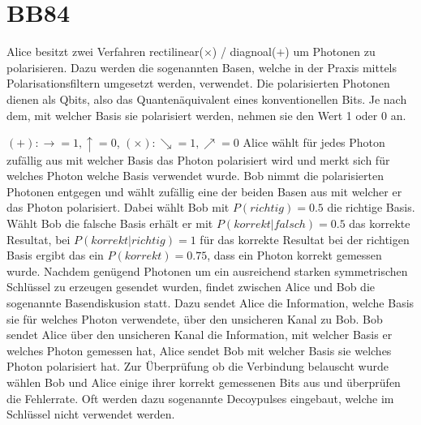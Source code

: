 \section{BB84}

  Alice besitzt zwei Verfahren rectilinear($\times$) / diagnoal($+$) um Photonen zu polarisieren.
  Dazu werden die sogenannten Basen, welche in der Praxis mittels Polarisationsfiltern umgesetzt werden, verwendet.
  Die polarisierten Photonen dienen als Qbits, also das Quanten\"aquivalent eines konventionellen Bits.
  Je nach dem, mit welcher Basis sie polarisiert werden, nehmen sie den Wert 1 oder 0 an.\par
  $(+): \rightarrow = 1, \uparrow = 0 $, $(\times): \searrow = 1, \nearrow = 0$
  Alice w\"ahlt f\"ur jedes Photon zuf\"allig aus mit welcher Basis das Photon polarisiert wird und merkt sich f\"ur welches Photon welche Basis verwendet wurde.
  Bob nimmt die polarisierten Photonen entgegen und w\"ahlt zuf\"allig eine der beiden Basen aus mit welcher er das Photon polarisiert.
  Dabei w\"ahlt Bob mit $P(richtig)=0.5$ die richtige Basis.
  W\"ahlt Bob die falsche Basis erh\"alt er mit $P(korrekt|falsch)=0.5$ das korrekte Resultat, bei $P(korrekt|richtig)=1$ f\"ur das korrekte Resultat bei der richtigen Basis ergibt das ein $P(korrekt)=0.75$, dass ein Photon korrekt gemessen wurde.
  Nachdem gen\"ugend Photonen um ein ausreichend starken symmetrischen Schl\"ussel zu erzeugen gesendet wurden, findet zwischen Alice und Bob die sogenannte Basendiskusion statt.
  Dazu sendet Alice die Information, welche Basis sie f\"ur welches Photon verwendete, \"uber den unsicheren Kanal zu Bob.
  Bob sendet Alice \"uber den unsicheren Kanal die Information, mit welcher Basis er welches Photon gemessen hat, Alice sendet Bob mit welcher Basis sie welches Photon polarisiert hat.
  Zur \"Uberpr\"ufung ob die Verbindung belauscht wurde w\"ahlen Bob und Alice einige ihrer korrekt gemessenen Bits aus und \"uberpr\"ufen die Fehlerrate.
  Oft werden dazu sogenannte Decoypulses eingebaut, welche im Schl\"ussel nicht verwendet werden.


